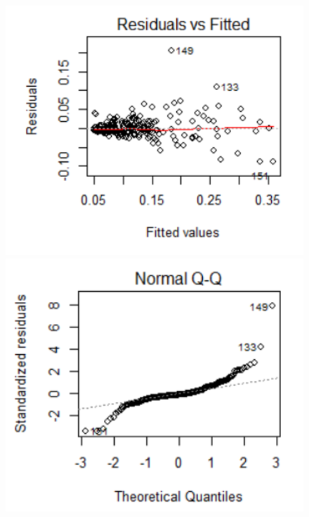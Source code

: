 \documentclass[11pt, letterpaper]{article} %
\begin{document}
\begin{figure}[htbp]
\begin{minipage}[t]{0.5\textwidth}
\centering
\includegraphics[width=\textwidth]{Capture1.PNG}
\end{minipage}
\begin{minipage}[t]{0.5\textwidth}
\centering
\includegraphics[width=\textwidth]{Capture2.PNG}
\end{minipage}
\end{figure}
\end{document}

